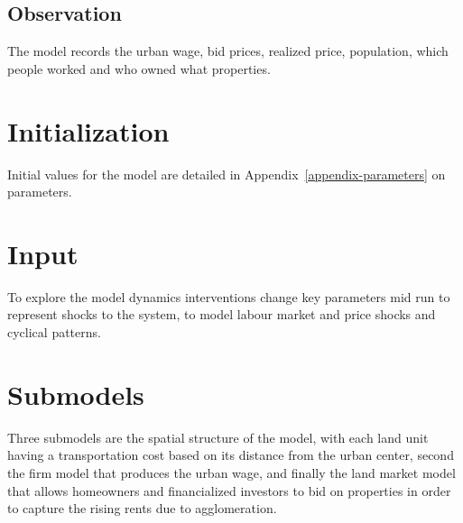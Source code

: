 \subsection{Observation}
The model records the urban wage, bid prices, realized price, population, which people worked and who owned what properties.

\section{Initialization}
Initial values for the model are detailed in Appendix~\ref{appendix-parameters} on parameters.

\section{Input}
To explore the model dynamics interventions change key parameters mid run to represent shocks to the system, to model labour market and price shocks and cyclical patterns. %

\section{Submodels}
Three submodels are the spatial structure of the model, with each land unit having a transportation cost based on its distance from the urban center, second the firm model that produces the urban wage, and finally the land market model that allows homeowners and financialized investors to bid on properties in order to capture the rising rents due to agglomeration.  
